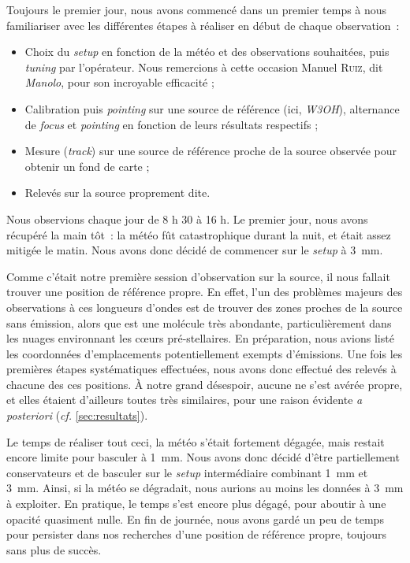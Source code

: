 \documentclass[a4paper,10pt,french]{article}
\newcommand{\setup}{\textit{setup}}
\newcommand{\troismm}{\SI{3}{\milli\meter}}
\newcommand{\unmm}{\SI{1}{\milli\meter}}
\begin{document}
Toujours le premier jour, nous avons commencé dans un premier temps à nous
familiariser avec les différentes étapes à réaliser en début de chaque
observation :
\begin{itemize}
    \item Choix du \setup{} en fonction de la météo et des observations
          souhaitées, puis \textit{tuning} par l’opérateur. Nous remercions à
          cette occasion Manuel \textsc{Ruiz}, dit \textit{Manolo}, pour son incroyable
          efficacité ;
    \item Calibration puis \textit{pointing} sur une source de référence (ici,
          \textit{W3OH}), alternance de \textit{focus} et \textit{pointing} en
          fonction de leurs résultats respectifs ;
    \item Mesure (\textit{track}) sur une source de référence proche de la
          source observée pour obtenir un fond de carte ;
    \item Relevés sur la source proprement dite.
\end{itemize}

Nous observions chaque jour de 8 h 30 à 16 h. Le premier jour, nous avons
récupéré la main tôt : la météo fût catastrophique durant la nuit, et était
assez mitigée le matin. Nous avons donc décidé de commencer sur le \setup{} à
\troismm.

Comme c’était notre première session d’observation sur la source, il nous
fallait trouver une position de référence propre. En effet, l’un des problèmes
majeurs des observations à ces longueurs d’ondes est de trouver des zones
proches de la source sans émission, alors que  est une molécule
très abondante, particulièrement dans les nuages environnant les cœurs
pré-stellaires. En préparation, nous avions listé les coordonnées
d’emplacements potentiellement exempts d’émissions. Une fois les premières
étapes systématiques effectuées, nous avons donc effectué des relevés à chacune
des ces positions. À notre grand désespoir, aucune ne s’est avérée propre, et
elles étaient d’ailleurs toutes très similaires, pour une raison évidente
\textit{a posteriori} (\textit{cf.} \cref{sec:resultats}).

Le temps de réaliser tout ceci, la météo s’était fortement dégagée, mais
restait encore limite pour basculer à \unmm. Nous avons donc décidé d’être
partiellement conservateurs et de basculer sur le \setup{} intermédiaire
combinant \unmm{} et \troismm. Ainsi, si la météo se dégradait, nous aurions au
moins les données à \troismm{} à exploiter. En pratique, le temps s’est
encore plus dégagé, pour aboutir à une opacité quasiment nulle. En fin de
journée, nous avons gardé un peu de temps pour persister dans nos recherches
d’une position de référence propre, toujours sans plus de succès.
\end{document}
